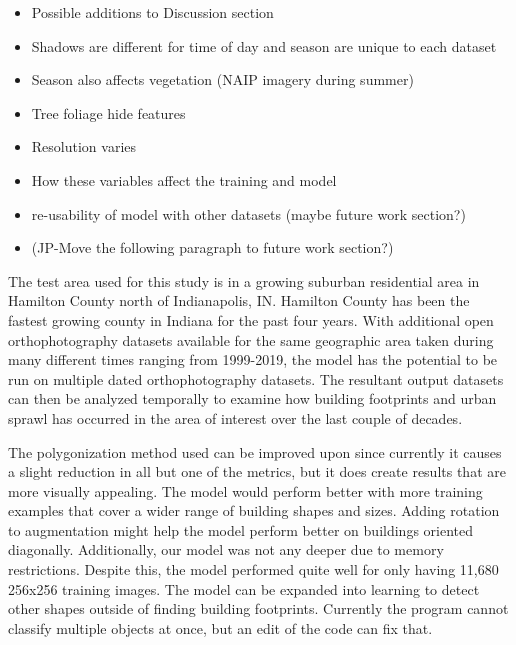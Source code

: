 \documentclass[acmtog, authorversion]{acmart}
\begin{document}
\begin{itemize}
\item Possible additions to Discussion section
\item Shadows are different for time of day and season are unique to each dataset
\item Season also affects vegetation (NAIP imagery during summer)
\item Tree foliage hide features
\item Resolution varies
\item How these variables affect the training and model
\item re-usability of model with other datasets (maybe future work section?)
\end{itemize}


\begin{itemize}
\item (JP-Move the following paragraph to future work section?)
\end{itemize}
 The test area used for this study is in a growing suburban residential area in Hamilton County north of Indianapolis, IN.  Hamilton County has been the fastest growing county in Indiana for the past four years\cite{IBRC https://news.iu.edu/stories/2019/04/iub/releases/18-indiana-sees-stronger-population-growth-census.html}.  With additional open orthophotography datasets available for the same geographic area taken during many different times ranging from 1999-2019, the model has the potential to be run on multiple dated orthophotography datasets.  The resultant output datasets can then be analyzed temporally to examine how building footprints and urban sprawl has occurred in the area of interest over the last couple of decades.



The polygonization method used can be improved upon since currently it causes a slight reduction in all but one of the metrics, but it does create results that are more visually appealing. The model would perform better with more training examples that cover a wider range of building shapes and sizes. Adding rotation to augmentation might help the model perform better on buildings oriented diagonally. Additionally, our model was not any deeper due to memory restrictions. Despite this, the model performed quite well for only having 11,680 256x256 training images. The model can be expanded into learning to detect other shapes outside of finding building footprints. Currently the program cannot classify multiple objects at once, but an edit of the code can fix that.
\end{document}
